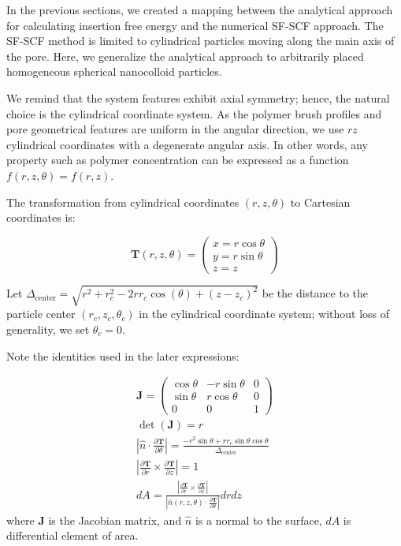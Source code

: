 \documentclass[10pt, a4paper]{article}
\begin{document}
\begin{multicols}{2}

In the previous sections, we created a mapping between the analytical approach for calculating insertion free energy and the numerical SF-SCF approach.
The SF-SCF method is limited to cylindrical particles moving along the main axis of the pore.
Here, we generalize the analytical approach to arbitrarily placed homogeneous spherical nanocolloid particles.

We remind that the system features exhibit axial symmetry; hence, the natural choice is the cylindrical coordinate system.
As the polymer brush profiles and pore geometrical features are uniform in the angular direction, we use $rz$ cylindrical coordinates with a degenerate angular axis.
In other words, any property such as polymer concentration can be expressed as a function $f(r, z, \theta) = f(r, z)$.

The transformation from cylindrical coordinates $(r, z, \theta)$ to Cartesian coordinates is:

\begin{equation}
    \bm{T}(r, z, \theta) = 
    \begin{pmatrix}
        x = r \cos \theta\\
        y = r \sin \theta\\
        z = z
    \end{pmatrix}
\end{equation}

Let $\Delta_{\text{center}} = \sqrt{r^2 + r_c^2 - 2 r r_c \cos(\theta) + (z - z_c)^2}$ be the distance to the particle center $(r_c, z_c, \theta_c)$ in the cylindrical coordinate system; without loss of generality, we set $\theta_c = 0$.

Note the identities used in the later expressions:

\begin{gather}
    \bm{J} = 
    \begin{pmatrix}
        \cos{\theta} & -r\sin\theta & 0 \\
        \sin{\theta} &  r\cos\theta & 0 \\
        0           & 0            & 1
    \end{pmatrix}\\
    \det(\bm{J}) = r \\
    \left| \hat{n} \cdot \frac{\partial \bm{T}}{\partial \theta} \right| = \frac{-r^2 \sin \theta + r r_c \sin \theta \cos \theta}{\Delta_{\text{center}}}\\
    \left| \frac{\partial \bm{T}}{\partial r} \times \frac{\partial \bm{T}}{\partial z} \right| = 1\\
    dA = \frac{\left|\frac{\partial \bm{T}}{\partial r} \times \frac{\partial \bm{T}}{\partial z} \right|}{\left|\hat{n}(r, z, \theta) \cdot \frac{\partial\bm{T}}{\partial \theta}\right|} dr dz
\end{gather}
where $\bm{J}$ is the Jacobian matrix, and $\hat{n}$ is a normal to the surface, $dA$ is differential element of area.


\end{multicols}
\end{document}
